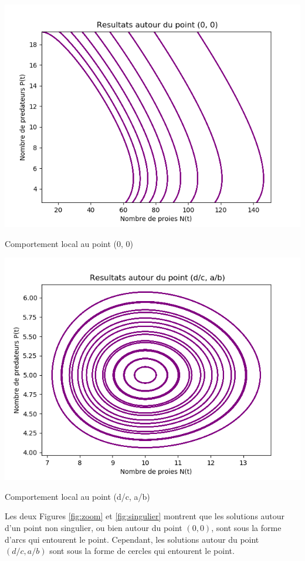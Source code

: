 \begin{minipage}[c]{.46\linewidth}
    \centering
    \includegraphics[width=\linewidth]{images/zoom.png}
    \captionsetup{type=figure}\caption{Comportement local au point (0, 0)}
    \label{fig:zoom}
\end{minipage}
\hfill
\begin{minipage}[c]{.46\linewidth}
    \centering
    \includegraphics[width=\linewidth]{images/singulier.png}
    \captionsetup{type=figure}\caption{Comportement local au point (d/c, a/b)}
    \label{fig:singulier}
\end{minipage}
\vspace{4.00mm}

Les deux Figures \ref{fig:zoom} et \ref{fig:singulier} montrent que les solutions autour d'un point non singulier, ou bien autour du point $(0,0)$, sont sous la forme d'arcs qui entourent le point. Cependant, les solutions autour du point $(d/c, a/b)$ sont sous la forme de cercles qui entourent le point.
